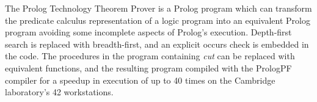 The Prolog Technology Theorem Prover is a Prolog program which can transform the predicate
calculus representation of a logic program into an equivalent Prolog program avoiding
some incomplete aspects of Prolog's execution.  Depth-first search is replaced with
breadth-first, and an explicit occurs check is embedded in the code.  The procedures in the
program containing \textit{cut} can be replaced with equivalent functions, and the
resulting program compiled with the PrologPF compiler for a speedup in execution of up
to 40 times on the Cambridge laboratory's 42 workstations.
